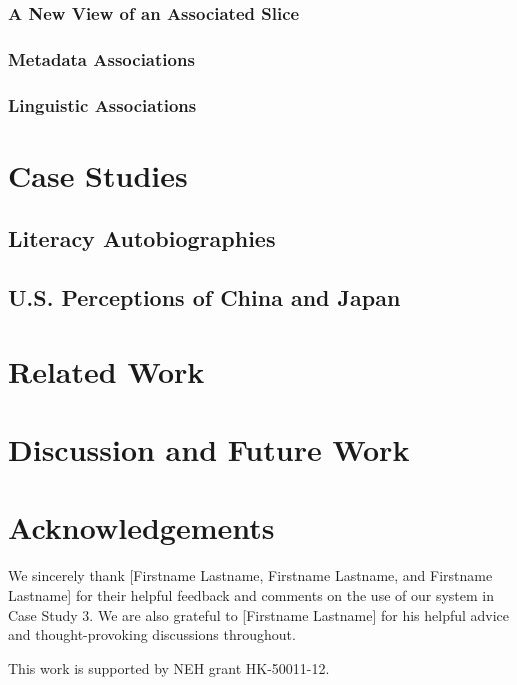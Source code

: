\documentclass{sig-alternate}
\begin{document}
\subsubsection{A New View of an Associated Slice}

\subsubsection*{Metadata Associations}


\subsubsection*{Linguistic Associations}



\section{Case Studies}

\subsection{Literacy Autobiographies}

\subsection{U.S. Perceptions of China and Japan}


\section {Related Work}

\section{Discussion and Future Work}

\section{Acknowledgements}
We sincerely thank [Firstname Lastname, Firstname Lastname, and Firstname Lastname] for their helpful feedback and comments on the use of our system in Case Study 3. We are also grateful to [Firstname Lastname] for his helpful advice and thought-provoking discussions throughout.

This work is supported by NEH grant HK-50011-12.


 
  
\end{document}
